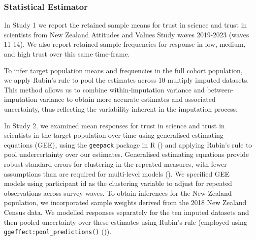 \documentclass[
  single column]{article}
\begin{document}
\subsubsection{Statistical Estimator}\label{statistical-estimator}

In Study 1 we report the retained sample means for trust in science and
trust in scientists from New Zealand Attitudes and Values Study waves
2019-2023 (waves 11-14). We also report retained sample frequencies for
response in low, medium, and high trust over this same time-frame.

To infer target population means and frequencies in the full cohort
population, we apply Rubin's rule to pool the estimates across 10
multiply imputed datasets. This method allows us to combine
within-imputation variance and between-imputation variance to obtain
more accurate estimates and associated uncertainty, thus reflecting the
variability inherent in the imputation process.

In Study 2, we examined mean responses for trust in science and trust in
scientists in the target population over time using generalised
estimating equations (GEE), using the \texttt{geepack} package in R
() and applying
Rubin's rule to pool undercertainty over our estimates. Generalised
estimating equations provide robust standard errors for clustering in
the repeated measures, with fewer assumptions than are required for
multi-level models
().
We specified GEE models using participant id as the clustering variable
to adjust for repeated observations across survey waves. To obtain
inferences for the New Zealand population, we incorporated sample
weights derived from the 2018 New Zealand Census data. We modelled
responses separately for the ten imputed datasets and then pooled
uncertainty over these estimates using Rubin's rule (employed using
\texttt{ggeffect:pool\_predictions()}
()).
\end{document}
